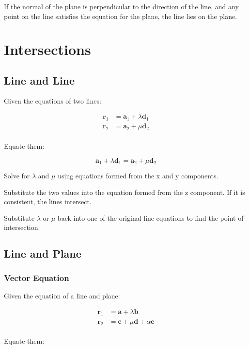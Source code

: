 \documentclass[a4paper,11pt]{article}
\newcommand{\bb}{\boldsymbol}
\begin{document}
If the normal of the plane is perpendicular to the direction of the line, and
any point on the line satisfies the equation for the plane, the line lies on
the plane.




\section{Intersections}

\subsection{Line and Line}

Given the equations of two lines:

$$
\begin{aligned}
\bb{r}_1 & = \bb{a}_1 + \lambda \bb{d}_1 \\
\bb{r}_2 & = \bb{a}_2 + \mu \bb{d}_2 \\
\end{aligned}
$$

Equate them:

$$
\bb{a}_1 + \lambda \bb{d}_1 = \bb{a}_2 + \mu \bb{d}_2
$$

Solve for $\lambda$ and $\mu$ using equations formed from the x and y
components.

Substitute the two values into the equation formed from the z component. If it
is consistent, the lines intersect.

Substitute $\lambda$ or $\mu$ back into one of the original line equations to
find the point of intersection.


\subsection{Line and Plane}

\subsubsection{Vector Equation}

Given the equation of a line and plane:

$$
\begin{aligned}
\bb{r}_1 & = \bb{a} + \lambda \bb{b} \\
\bb{r}_2 & = \bb{c} + \mu \bb{d} + \alpha \bb{e} \\
\end{aligned}
$$

Equate them:
\end{document}
